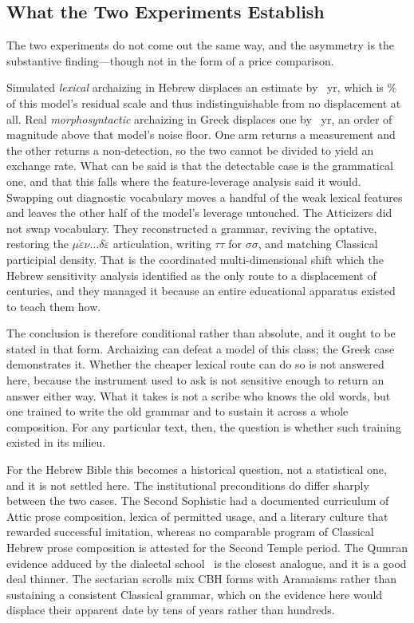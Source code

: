 \documentclass[10pt,letterpaper]{article}
\newcommand{\cbh}{CBH}
\begin{document}
\subsection*{What the Two Experiments Establish}

The two experiments do not come out the same way, and the asymmetry is the
substantive finding---though not in the form of a price comparison.

Simulated \emph{lexical} archaizing in Hebrew displaces an estimate by
\arcMeanAbs~yr, which is \DETpct\% of this model's residual scale and thus
indistinguishable from no displacement at all.  Real \emph{morphosyntactic}
archaizing in Greek displaces one by \GKattshiftAbs~yr, an order of magnitude
above that model's noise floor.  One arm returns a measurement and the other
returns a non-detection, so the two cannot be divided to yield an exchange rate.
What can be said is that the detectable case is the grammatical one, and that
this falls where the feature-leverage analysis
said it would.  Swapping out diagnostic vocabulary moves a handful of the
\sensLexCount{} weak lexical features and leaves the other half of the model's
leverage untouched.  The Atticizers did not swap vocabulary.  They reconstructed
a grammar, reviving the optative, restoring the
$\mu\acute{\varepsilon}\nu \ldots \delta\acute{\varepsilon}$ articulation,
writing $\tau\tau$ for $\sigma\sigma$, and matching Classical participial
density.  That is the coordinated multi-dimensional shift which the Hebrew
sensitivity analysis identified as the only route to a displacement of
centuries, and they managed it because an entire educational apparatus existed
to teach them how.

The conclusion is therefore conditional rather than absolute, and it ought to be
stated in that form.  Archaizing can defeat a model of this class; the Greek
case demonstrates it.  Whether the cheaper lexical route can do so is not
answered here, because the instrument used to ask is not sensitive enough to
return an answer either way.  What it
takes is not a scribe who knows the old words, but one trained to write the old
grammar and to sustain it across a whole composition.  For any particular text,
then, the question is whether such training existed in its milieu.

For the Hebrew Bible this becomes a historical question, not a statistical
one, and it is not settled here.  The institutional preconditions do
differ sharply between the two cases.  The Second Sophistic had a documented
curriculum of Attic prose composition, lexica of permitted usage, and a literary
culture that rewarded successful imitation, whereas no comparable program of
Classical Hebrew prose composition is attested for the Second Temple period.
The Qumran evidence adduced by the dialectal school~\cite{Young2008} is the
closest analogue, and it is a good deal thinner.  The sectarian scrolls mix
\cbh{} forms with Aramaisms rather than sustaining a consistent Classical
grammar, which on the evidence here would displace their apparent date by tens
of years rather than hundreds.
\end{document}
